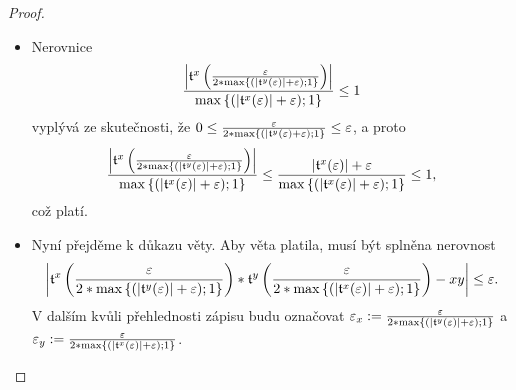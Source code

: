 \begin{theorem}
\begin{proof}
\begin{itemize}
\item{Nerovnice
\begin{equation}\label{ner:abst3}
\frac{\left|\mathfrak{t}^{x}\left(\frac{\varepsilon}{2*\mathrm{max}\left\{(|\mathfrak{t}^{y}(\varepsilon)| + \varepsilon);1\right\}}\right)\right|}{\mathrm{max}\left\{(|\mathfrak{t}^{x}(\varepsilon)| + \varepsilon);1\right\}}\leq 1
\end{equation}
vyplývá ze skutečnosti, že $0\leq\frac{\varepsilon}{2*\mathrm{max}\{(|\mathfrak{t}^{y}(\varepsilon)+\varepsilon);1\}}\leq\varepsilon$, a proto
\begin{equation}
\frac{\left|\mathfrak{t}^{x}\left(\frac{\varepsilon}{2*\mathrm{max}\left\{(|\mathfrak{t}^{y}(\varepsilon)| + \varepsilon);1\right\}}\right)\right|}{\mathrm{max}\left\{(|\mathfrak{t}^{x}(\varepsilon)| + \varepsilon);1\right\}}\leq\frac{|\mathfrak{t}^{x}(\varepsilon)|+\varepsilon}{\mathrm{max}\left\{(|\mathfrak{t}^{x}(\varepsilon)| + \varepsilon);1\right\}}\leq 1,
\end{equation}což platí.}

\item{Nyní přejděme k důkazu věty. Aby věta platila, musí být splněna nerovnost
\begin{equation}
\left| \mathfrak{t}^{x}\left(\frac{\varepsilon}{2*\mathrm{max}\left\{(|\mathfrak{t}^{y}(\varepsilon)| + \varepsilon);1\right\}}\right)*\mathfrak{t}^{y}\left(\frac{\varepsilon}{2*\mathrm{max}\left\{(|\mathfrak{t}^{x}(\varepsilon)| + \varepsilon);1\right\}}\right) -xy \right|\leq\varepsilon.
\end{equation} V dalším kvůli přehlednosti zápisu budu označovat $\varepsilon_x := \frac{\varepsilon}{2*\mathrm{max}\left\{(|\mathfrak{t}^{y}(\varepsilon)| + \varepsilon);1\right\}}$ a $\varepsilon_y := \frac{\varepsilon}{2*\mathrm{max}\left\{(|\mathfrak{t}^{x}(\varepsilon)| + \varepsilon);1\right\}}$.

}
\end{itemize}
\end{proof}
\end{theorem}
